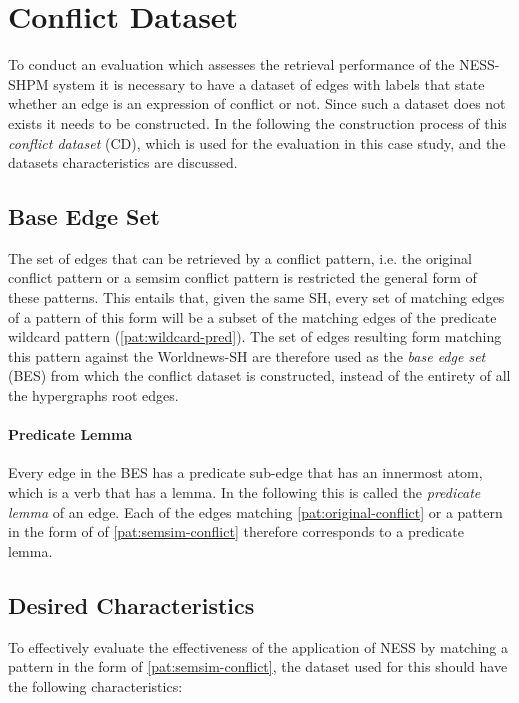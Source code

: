 \documentclass[11pt]{scrreprt}
\begin{document}
\section{Conflict Dataset}
\label{sec:conflict-dataset}
To conduct an evaluation which assesses the retrieval performance of the NESS-SHPM system it is necessary to have a dataset of edges with labels that state whether an edge is an expression of conflict or not. Since such a dataset does not exists it needs to be constructed. In the following the construction process of this \textit{conflict dataset} (CD), which is used for the evaluation in this case study, and the datasets characteristics are discussed.


\subsection{Base Edge Set}
\label{sec:base-edge-set}
The set of edges that can be retrieved by a conflict pattern, i.e. the original conflict pattern or a semsim conflict pattern is restricted the general form of these patterns. This entails that, given the same SH, every set of matching edges of a pattern of this form will be a subset of the matching edges of the predicate wildcard pattern (\cref{pat:wildcard-pred}). The set of edges resulting form matching this pattern against the Worldnews-SH are therefore used as the \textit{base edge set} (BES) from which the conflict dataset is constructed, instead of the entirety of all the hypergraphs root edges.

\paragraph{Predicate Lemma} Every edge in the BES has a predicate sub-edge that has an innermost atom, which is a verb that has a lemma. In the following this is called the \textit{predicate lemma} of an edge. Each of the edges matching \cref{pat:original-conflict} or a pattern in the form of of \cref{pat:semsim-conflict} therefore corresponds to a predicate lemma.


\subsection{Desired Characteristics}
\label{sec:dataset-characteristics}
To effectively evaluate the effectiveness of the application of NESS by matching a pattern in the form of \cref{pat:semsim-conflict}, the dataset used for this should have the following characteristics:
\end{document}
